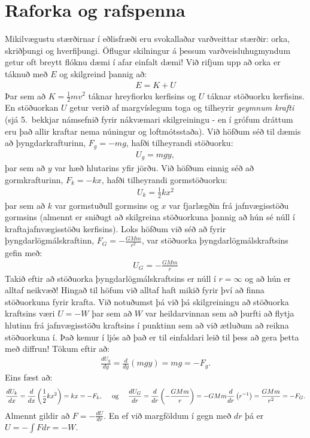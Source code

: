 
\chapter{Raforka og rafspenna}

Mikilvægustu stærðirnar í eðlisfræði eru svokallaðar varðveittar stærðir: orka, skriðþungi og hverfiþungi. Öflugur skilningur á þessum varðveisluhugmyndum getur oft breytt flóknu dæmi í afar einfalt dæmi! Við rifjum upp að orka er táknuð með $E$ og skilgreind þannig að:
\begin{align*}
    E = K + U
\end{align*}
Þar sem að $K = \frac{1}{2}mv^2$ táknar hreyfiorku kerfisins og $U$ táknar stöðuorku kerfisins. En stöðuorkan $U$ getur verið af margvíslegum toga og tilheyrir \emph{geymnum krafti} (sjá 5.~bekkjar námsefnið
fyrir nákvæmari skilgreiningu - en í grófum dráttum eru það allir kraftar nema núningur og loftmótsstaða). Við höfðum séð til dæmis að þyngdarkrafturinn, $F_g = -mg$, hafði tilheyrandi stöðuorku:
\begin{align*}
    U_g = mgy,
\end{align*}
þar sem að $y$ var hæð hlutarins yfir jörðu. Við höfðum einnig séð að gormkrafturinn, $F_k = -kx$, hafði tilheyrandi gormstöðuorku:
\begin{align*}
    U_k = \frac{1}{2}kx^2
\end{align*}
þar sem að $k$ var gormstuðull gormsins og $x$ var fjarlægðin frá jafnvægisstöðu gormsins (almennt er sniðugt að skilgreina stöðuorkuna þannig að hún sé núll í kraftajafnvægisstöðu kerfisins). Loks höfðum við séð að fyrir þyngdarlögmálskraftinn, $F_G = -\frac{GMm}{r^2}$, var stöðuorka þyngdarlögmálskraftsins gefin með:
\begin{align*}
    U_G = -\frac{GMm}{r}
\end{align*}
Takið eftir að stöðuorka þyngdarlögmálskraftsins er núll í $r = \infty$ og að hún er alltaf neikvæð! Hingað til höfum við alltaf haft mikið fyrir því að finna stöðuorkuna fyrir krafta. Við notuðumst þá við þá skilgreiningu að stöðuorka kraftsins væri $U = -W$ þar sem að $W$ var heildarvinnan sem að þurfti að flytja hlutinn frá jafnvægisstöðu kraftsins í punktinn sem að við ætluðum að reikna stöðuorkuna í. Það kemur í ljós að það er til einfaldari leið til þess að gera þetta með diffrun! Tökum eftir að:
\begin{align*}
    \frac{dU_g}{dy} = \frac{d}{dy}\left( mgy\right) = mg = -F_g.
\end{align*}
Eins fæst að:
\begin{align*}
    \frac{dU_k}{dx} = \frac{d}{dx}\left( \frac{1}{2}kx^2 \right) = kx = -F_k, \hspace{0.5cm} \text{og} \hspace{0.5cm} \frac{dU_G}{dr} = \frac{d}{dr}\left( -\frac{GMm}{r} \right) = -GMm \frac{d}{dr}\left( r^{-1} \right) = \frac{GMm}{r^2} = -F_G.
\end{align*}
Almennt gildir að $F = -\frac{dU}{dr}$. En ef við margföldum í gegn með $dr$ þá er $U = -\int F dr = -W$.

